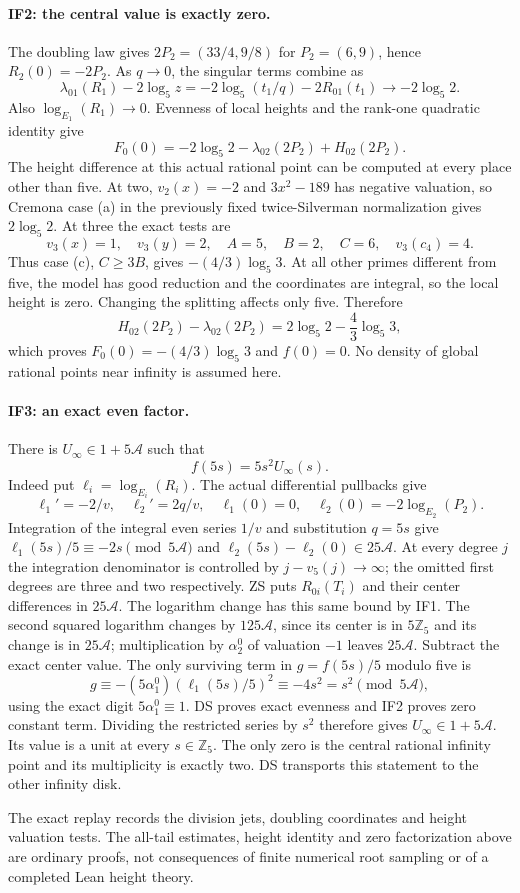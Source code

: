 \paragraph{IF2: the central value is exactly zero.}
The doubling law gives $2P_2=(33/4,9/8)$ for $P_2=(6,9)$, hence
$R_2(0)=-2P_2$. As $q\to0$, the singular terms combine as
\[
 \lambda_{01}(R_1)-2\log_5z
 =-2\log_5(t_1/q)-2R_{01}(t_1)\longrightarrow-2\log_5 2.
\]
Also $\log_{E_1}(R_1)\to0$. Evenness of local heights and the
rank-one quadratic identity give
\[
 F_0(0)=-2\log_5 2-\lambda_{02}(2P_2)+H_{02}(2P_2).
\]
The height difference at this actual rational point can be computed
at every place other than five. At two, $v_2(x)=-2$ and
$3x^2-189$ has negative valuation, so Cremona case (a) in the
previously fixed twice-Silverman normalization gives $2\log_5 2$.
At three the exact tests are
\[
 v_3(x)=1,\quad v_3(y)=2,\quad A=5,\quad B=2,\quad C=6,\quad v_3(c_4)=4.
\]
Thus case (c), $C\ge3B$, gives $-(4/3)\log_5 3$. At all other
primes different from five, the model has good reduction and the
coordinates are integral, so the local height is zero. Changing
the splitting affects only five. Therefore
\[
 H_{02}(2P_2)-\lambda_{02}(2P_2)
 =2\log_5 2-\frac43\log_5 3,
\]
which proves $F_0(0)=-(4/3)\log_5 3$ and $f(0)=0$.
No density of global rational points near infinity is assumed here.

\paragraph{IF3: an exact even factor.}
There is $U_\infty\in1+5\mathcal A$ such that
\[
 f(5s)=5s^2U_\infty(s).
\]
Indeed put $\ell_i=\log_{E_i}(R_i)$. The actual differential pullbacks give
\[
 \ell_1'=-2/v,\quad \ell_2'=2q/v,\quad
 \ell_1(0)=0,\quad \ell_2(0)=-2\log_{E_2}(P_2).
\]
Integration of the integral even series $1/v$ and substitution $q=5s$
give $\ell_1(5s)/5\equiv-2s\pmod{5\mathcal A}$ and
$\ell_2(5s)-\ell_2(0)\in25\mathcal A$. At every degree $j$ the
integration denominator is controlled by $j-v_5(j)\to\infty$;
the omitted first degrees are three and two respectively.
ZS puts $R_{0i}(T_i)$ and their center differences in $25\mathcal A$.
The logarithm change has this same bound by IF1. The second squared
logarithm changes by $125\mathcal A$, since its center is in
$5\mathbb Z_5$ and its change is in $25\mathcal A$; multiplication
by $\alpha_2^0$ of valuation $-1$ leaves $25\mathcal A$.
Subtract the exact center value. The only surviving term in
$g=f(5s)/5$ modulo five is
\[
 g\equiv-(5\alpha_1^0)(\ell_1(5s)/5)^2
 \equiv-4s^2=s^2\pmod{5\mathcal A},
\]
using the exact digit $5\alpha_1^0\equiv1$. DS proves exact evenness
and IF2 proves zero constant term. Dividing the restricted series by
$s^2$ therefore gives $U_\infty\in1+5\mathcal A$. Its value is a
unit at every $s\in\mathbb Z_5$. The only zero is the central rational
infinity point and its multiplicity is exactly two. DS transports
this statement to the other infinity disk.

The exact replay records the division jets, doubling coordinates and
height valuation tests. The all-tail estimates, height identity and
zero factorization above are ordinary proofs, not consequences of
finite numerical root sampling or of a completed Lean height theory.

